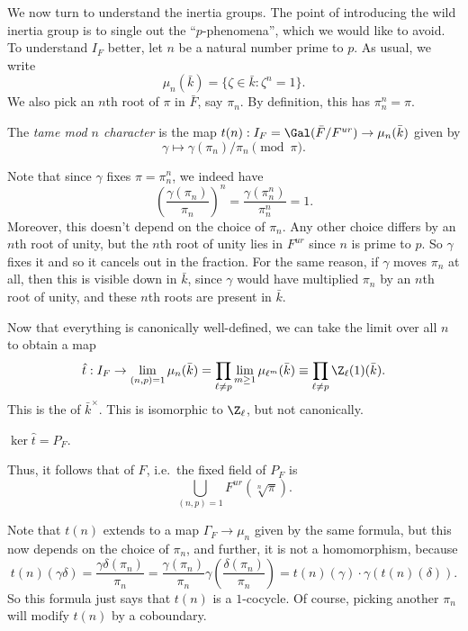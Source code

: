 \documentclass[a4paper]{article}
\begin{document}
We now turn to understand the inertia groups. The point of introducing the wild inertia group is to single out the ``$p$-phenomena'', which we would like to avoid. To understand $I_F$ better, let $n$ be a natural number prime to $p$. As usual, we write
\[
  \mu_n(\bar{k}) = \{\zeta \in \bar{k}: \zeta^n = 1\}.
\]
We also pick an $n$th root of $\pi$ in $\bar{F}$, say $\pi_n$. By definition, this has $\pi_n^n = \pi$.
\begin{defi}
  The \emph{tame mod $n$ character} is the map $t(n): I_F = \Gal(\bar{F}/F^{ur}) \to \mu_n(\bar{k})$ given by
  \[
    \gamma \mapsto \gamma(\pi_n)/\pi_n \pmod \pi.
  \]
\end{defi}
Note that since $\gamma$ fixes $\pi = \pi_n^n$, we indeed have
\[
  \left(\frac{\gamma(\pi_n)}{\pi_n}\right)^{n} = \frac{\gamma(\pi_n^n)}{\pi_n^n} = 1.
\]
Moreover, this doesn't depend on the choice of $\pi_n$. Any other choice differs by an $n$th root of unity, but the $n$th root of unity lies in $F^{ur}$ since $n$ is prime to $p$. So $\gamma$ fixes it and so it cancels out in the fraction. For the same reason, if $\gamma$ moves $\pi_n$ at all, then this is visible down in $\bar{k}$, since $\gamma$ would have multiplied $\pi_n$ by an $n$th root of unity, and these $n$th roots are present in $\bar{k}$.

Now that everything is canonically well-defined, we can take the limit over all $n$ to obtain a map
\[
  \hat{t}: I_F \to \lim_{(n, p) = 1} \mu_n(\bar{k}) = \prod_{\ell \not= p} \lim_{m \geq 1} \mu_{\ell^m}(\bar{k}) \equiv \prod_{\ell \not= p} \Z_{\ell}(1)(\bar{k}).
\]
This  is the  of $\bar{k}^{\times}$. This is isomorphic to $\Z_{\ell}$, but not canonically.

\begin{thm}
  $\ker \hat{t} = P_F$.
\end{thm}
Thus, it follows that  of $F$, i.e.\ the fixed field of $P_F$ is
\[
  \bigcup_{(n, p) = 1} F^{ur} (\sqrt[n]{\pi}).
\]

Note that $t(n)$ extends to a map $\Gamma_F \to \mu_n$ given by the same formula, but this now depends on the choice of $\pi_n$, and further, it is not a homomorphism, because
\[
  t(n)(\gamma \delta) = \frac{\gamma\delta(\pi_n)}{\pi_n} = \frac{\gamma(\pi_n)}{\pi_n} \gamma \left(\frac{\delta(\pi_n)}{\pi_n}\right) = t(n)(\gamma) \cdot \gamma(t(n)(\delta)).
\]
So this formula just says that $t(n)$ is a $1$-cocycle. Of course, picking another $\pi_n$ will modify $t(n)$ by a coboundary.
\end{document}
